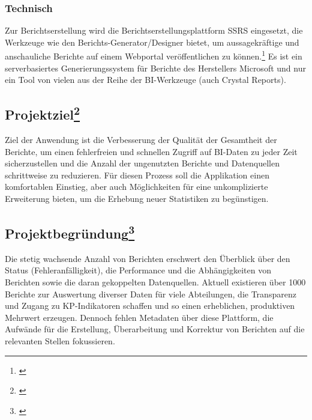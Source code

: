 \subsubsection{Technisch}
\label{sec:Ausgangssituation:Technisch}
Zur Berichtserstellung wird die Berichtserstellungsplattform \ac{SSRS} eingesetzt, die Werkzeuge wie den Berichts-Generator/Designer bietet, um aussagekräftige und anschauliche Berichte auf einem Webportal veröffentlichen zu können.\footnote{\Vgl \cite{Projektantrag}}
Es ist ein serverbasiertes Generierungssystem für Berichte des Herstellers Microsoft und nur ein Tool von vielen aus der Reihe der \ac{BI}-Werkzeuge (\zB auch Crystal Reports).



\subsection[Projektziel]{Projektziel\footnote{\cite{Projektantrag}}}
\label{sec:Projektziel}
\begin{displayquote}
	Ziel der Anwendung ist die Verbesserung der Qualität der Gesamtheit der Berichte, um einen fehlerfreien und schnellen Zugriff auf \ac{BI}-Daten zu jeder Zeit sicherzustellen und die Anzahl der ungenutzten Berichte und Datenquellen schrittweise zu reduzieren. Für diesen Prozess soll die Applikation einen komfortablen Einstieg, aber auch Möglichkeiten für eine unkomplizierte Erweiterung bieten, um \ggfs die Erhebung neuer Statistiken zu begünstigen.
\end{displayquote}


\subsection[Projektbegründung]{Projektbegründung\footnote{\cite{Projektantrag}}}
\label{sec:Projektbegruendung}
\begin{displayquote}
	Die stetig wachsende Anzahl von Berichten erschwert den Überblick über den Status (Fehleranfälligkeit), die Performance und die Abhängigkeiten von Berichten sowie die daran gekoppelten Datenquellen. Aktuell existieren über 1000 Berichte zur Auswertung diverser Daten für viele Abteilungen, die \ua Transparenz und Zugang zu \ac{KP}-Indikatoren schaffen und so einen erheblichen, produktiven Mehrwert erzeugen. Dennoch fehlen Metadaten über diese Plattform, die Aufwände für die Erstellung, Überarbeitung und Korrektur von Berichten auf die relevanten Stellen fokussieren.
\end{displayquote}

